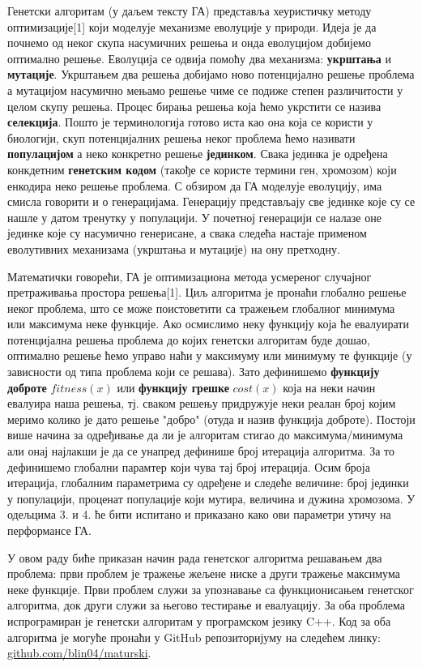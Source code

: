 \documentclass{article}
\begin{document}
Генетски алгоритам (у даљем тексту ГА) представља хеуристичку методу оптимизације[1] који моделује
механизме еволуције у природи. Идеја је да почнемо од неког скупа насумичних решења и онда
еволуцијом добијемо оптимално решење. Еволуција се одвија помоћу два механизма: \textbf{укрштања}
и \textbf{мутације}. Укрштањем два решења добијамо ново потенцијално решење проблема а мутацијом насумично мењамо решење чиме
се подиже степен различитости у целом скупу решења. Процес бирања решења која ћемо укрстити се назива 
\textbf{селекција}. Пошто је терминологија готово иста као она која се користи у биологији, скуп потенцијалних 
решења неког проблема ћемо називати \textbf{популацијом} а неко конкретно решење \textbf{јединком}. 
Свака јединка је одређена конкдетним \textbf{генетским кодом} (такође се користе термини ген, хромозом) који енкодира неко
решење проблема. С обзиром да  ГА моделује еволуцију, има смисла говорити и о генерацијама. Генерацију 
представљају све јединке које су се нашле у датом тренутку у популацији. У почетној генерацији се 
налазе оне јединке које су насумично генерисане, а свака следећа настаје применом еволутивних 
механизама (укрштања и мутације) на ону претходну. 

Математички говорећи, ГА је оптимизациона метода усмереног случајног претраживања
простора решења[1]. Циљ алгоритма је пронаћи глобално решење неког проблема, што се 
може поистоветити са тражењем глобалног минимума или максимума неке функције. Ако
осмислимо неку функцију која ће евалуирати потенцијална решења проблема до којих 
генетски алгоритам буде дошао, оптимално решење ћемо управо наћи у максимуму или
минимуму те функције (у зависности од типа проблема који се решава). Зато дефинишемо \textbf{функцију доброте}
$fitness(x)$ или \textbf{функцију грешке} $cost(x)$ која на неки начин евалуира наша решења, 
тј. сваком решењу придружује неки реалан број којим меримо колико је дато решење "добро" 
(отуда и назив функција доброте). Постоји више начина за одређивање да ли је алгоритам стигао до максимума/минимума али 
онај најлакши је да се унапред дефинише број итерација алгоритма. За то
дефинишемо глобални парамтер који чува тај број итерација. Осим броја итерација, глобалним 
параметрима су одређене и следеће величине: број јединки у популацији, проценат популације који мутира, величина и дужина хромозома. 
У одељцима 3. и 4. ће бити испитано и приказано како ови параметри утичу на перформансе ГА.

У овом раду биће приказан начин рада генетског алгоритма решавањем два проблема: први проблем
је тражење жељене ниске а други тражење максимума неке функције. Први проблем служи за 
упознавање са функционисањем генетског алгоритма, док други служи за његово тестирање и 
евалуацију. За оба проблема испрограмиран је генетски алгоритам у програмском језику 
C++. Код за оба алгоритма је могуће пронаћи у GitHub репозиторијуму на следећем
линку: \url{github.com/blin04/maturski}.
\end{document}
